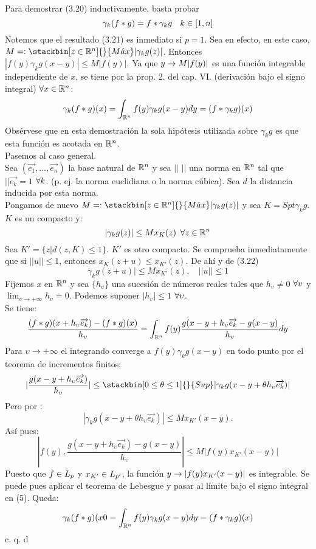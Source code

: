 Para demostrar (3.20) inductivamente, basta probar
\begin{equation}
\gamma_k (f*g)=f*\gamma_k g \phantom{ss} k \in [1,n]
\end{equation}
Notemos que el resultado (3.21) es inmediato si $p=1$. Sea en efecto, en este caso, $M=:  \stackbin[z \en \Rn]{}{M\acute{a}x} | \gamma_k g(z)|$. Entonces $|f(y) \gamma_k g(x-y)| \leq M|f(y)|$. Ya que $y \rightarrow M|f(y)|$ es una función integrable independiente de $x$, se tiene por la prop. 2. del cap. VI. (derivación bajo el signo integral) $\forall x \in \mathbb{R}^n$:
$$
\gamma_k (f*g)(x)=\int_{\mathbb{R}^n}f(y)\gamma_k g(x-y)dy=(f*\gamma_k g)(x)
$$
Obsérvese que en esta demostración la sola hipótesis utilizada sobre $\gamma_k g$ es que esta función es acotada en $\mathbb{R}^n$. \\
Pasemos al caso general. \\
Sea $(\overrightarrow{e_1}, \ldots,\overrightarrow{e_n})$ la base natural de $\mathbb{R}^n$ y sea $||$ $||$ una norma en $\mathbb{R}^n$ tal que $||\overrightarrow{e_k}=1$ $\forall k$. (p. ej. la norma euclidiana o la norma cúbica). Sea $d$ la distancia inducida por esta norma. \\
Pongamos de nuevo $M=:  \stackbin[z \en \Rn]{}{M\acute{a}x} | \gamma_k g(z)|$ y sea $K=Spt \gamma_k g$. $K$ es un compacto y:
\begin{equation}
|\gamma_k g(z)| \leq Mx_K (z) \phantom{s} \forall z \in \mathbb{R}^n
\end{equation}
Sea $K'= \lbrace z | d(z,K) \leq 1 \rbrace$. $K'$ es otro compacto. Se comprueba inmediatamente que si $||u|| \leq 1$, entonces $x_K (z+u) \leq x_{K'} (z)$. De ahí y de (3.22)
$$
\gamma_k g(z+u)| \leq Mx_{K'}(z), \phantom{ss} ||u|| \leq 1
$$
Fijemos $x$ en $\mathbb{R}^n$ y sea $\lbrace h_\upsilon \rbrace$ una sucesión de números reales tales que $h_\upsilon \neq 0$ $\forall \upsilon$ y $\lim_{\upsilon \to +\infty}h_\upsilon=0$. Podemos suponer $|h_\upsilon| \leq 1$ $\forall \upsilon$. \\
Se tiene:
\begin{equation}
\frac{(f*g)(x+h_\upsilon \overrightarrow{e_k})-(f*g)(x)}{h_\upsilon}=\int_{\mathbb{R}^n}f(y)\frac{g(x-y+h_\upsilon \overrightarrow{e_k}-g(x-y)}{h_\upsilon}dy
\end{equation}
Para $\upsilon \to +\infty$ el integrando converge a $f(y)\gamma_k g(x-y)$ en todo punto por el teorema de incrementos finitos: 
$$
|\frac{g(x-y+h_\upsilon \overrightarrow{e_k})}{h_\upsilon}| \leq  \stackbin[0 \leq \theta \leq 1]{}{Sup}|\gamma_k g(x-y+ \theta h_\upsilon \overrightarrow{e_k})| 
$$
Pero por :
$$
|\gamma_k g(x-y+ \theta h_\upsilon \overrightarrow{e_k})|  \leq Mx_{K'}(x-y).
$$
Así pues:
$$
|f(y),\frac{g(x-y+h_\upsilon \overrightarrow{e_k})-g(x-y) }{h_\upsilon}| \leq M|f(y)x_{K'}(x-y)|
$$
Puesto que $f \in L_p$ y $x_{K'} \in L_{p'}$, la función $y \rightarrow |f(y)x_{K'}(x-y)|$ es integrable. Se puede pues aplicar el teorema de Lebesgue y pasar al límite bajo el signo integral en (5). Queda:
$$
\gamma_k (f*g)(x0=\int_{\mathbb{R}^n} f(y) \gamma_k g(x-y)dy=(f*\gamma_k g)(x)
$$
 \phantom{sssssssssssssssssssssssssssssssssss sasdasdasdasdadadssada} c. q. d \\ \\


